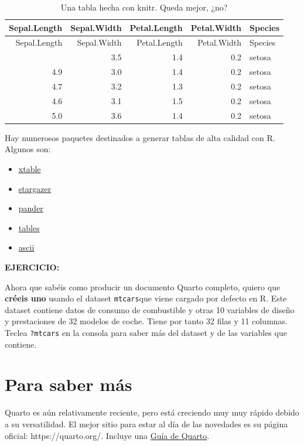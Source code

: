 \documentclass[
  letterpaper,
  DIV=11,
  numbers=noendperiod]{scrreprt}
\providecommand{\tightlist}{%
  \setlength{\itemsep}{0pt}\setlength{\parskip}{0pt}}\usepackage{longtable,booktabs,array}
\begin{document}
\begin{longtable}[]{@{}rrrrl@{}}
\caption{Una tabla hecha con knitr. Queda mejor, ¿no?}\tabularnewline
\toprule\noalign{}
Sepal.Length & Sepal.Width & Petal.Length & Petal.Width & Species \\
\midrule\noalign{}
\endfirsthead
\toprule\noalign{}
Sepal.Length & Sepal.Width & Petal.Length & Petal.Width & Species \\
\midrule\noalign{}
\endhead
\bottomrule\noalign{}
\endlastfoot
5.1 & 3.5 & 1.4 & 0.2 & setosa \\
4.9 & 3.0 & 1.4 & 0.2 & setosa \\
4.7 & 3.2 & 1.3 & 0.2 & setosa \\
4.6 & 3.1 & 1.5 & 0.2 & setosa \\
5.0 & 3.6 & 1.4 & 0.2 & setosa \\
\end{longtable}

Hay numerosos paquetes destinados a generar tablas de alta calidad con
R. Algunos son:

\begin{itemize}
\tightlist
\item
  \href{https://cran.r-project.org/web/packages/xtable/}{xtable}
\item
  \href{https://cran.r-project.org/web/packages/stargazer/}{stargazer}
\item
  \href{http://rapporter.github.io/pander/}{pander}
\item
  \href{https://cran.r-project.org/web/packages/tables/}{tables}
\item
  \href{http://eusebe.github.io/ascii/}{ascii}
\end{itemize}

\textbf{EJERCICIO:}

Ahora que sabéis como producir un documento Quarto completo, quiero que
\textbf{créeis uno} usando el dataset \texttt{mtcars}que viene cargado
por defecto en R. Este dataset contiene datos de consumo de combustible
y otras 10 variables de diseño y prestaciones de 32 modelos de coche.
Tiene por tanto 32 filas y 11 columnas. Teclea \texttt{?mtcars} en la
consola para saber más del dataset y de las variables que contiene.

\hypertarget{para-saber-muxe1s-1}{%
\section{Para saber más}\label{para-saber-muxe1s-1}}

Quarto es aún relativamente reciente, pero está creciendo muy muy rápido
debido a su versatilidad. El mejor sitio para estar al día de las
novedades es su página oficial: https://quarto.org/. Incluye una
\href{https://quarto.org/docs/guide/}{Guía de Quarto}.
\end{document}
